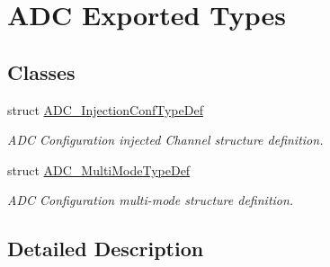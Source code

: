 \hypertarget{group___a_d_c_ex___exported___types}{}\section{A\+DC Exported Types}
\label{group___a_d_c_ex___exported___types}
\subsection*{Classes}
\begin{DoxyCompactItemize}
\item 
struct \mbox{\hyperlink{struct_a_d_c___injection_conf_type_def}{A\+D\+C\+\_\+\+Injection\+Conf\+Type\+Def}}
\begin{DoxyCompactList}\small\item\em A\+DC Configuration injected Channel structure definition. \end{DoxyCompactList}\item 
struct \mbox{\hyperlink{struct_a_d_c___multi_mode_type_def}{A\+D\+C\+\_\+\+Multi\+Mode\+Type\+Def}}
\begin{DoxyCompactList}\small\item\em A\+DC Configuration multi-\/mode structure definition. \end{DoxyCompactList}\end{DoxyCompactItemize}


\subsection{Detailed Description}
